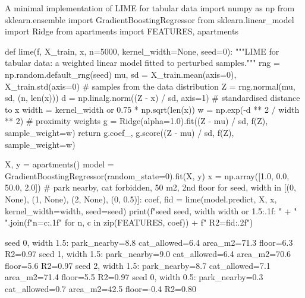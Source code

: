 \begin{pylisting}[label={lst:lime}]{A minimal implementation of LIME for tabular data}
import numpy as np
from sklearn.ensemble import GradientBoostingRegressor
from sklearn.linear_model import Ridge
from apartments import FEATURES, apartments

def lime(f, X_train, x, n=5000, kernel_width=None, seed=0):
    """LIME for tabular data: a weighted linear model fitted to perturbed samples."""
    rng = np.random.default_rng(seed)
    mu, sd = X_train.mean(axis=0), X_train.std(axis=0)
    # samples from the data distribution
    Z = rng.normal(mu, sd, (n, len(x)))
    d = np.linalg.norm((Z - x) / sd, axis=1)              # standardised distance to x
    width = kernel_width or 0.75 * np.sqrt(len(x))
    w = np.exp(-d ** 2 / width ** 2)                      # proximity weights
    g = Ridge(alpha=1.0).fit((Z - mu) / sd, f(Z), sample_weight=w)
    return g.coef_, g.score((Z - mu) / sd, f(Z), sample_weight=w)

X, y = apartments()
model = GradientBoostingRegressor(random_state=0).fit(X, y)
x = np.array([1.0, 0.0, 50.0, 2.0])         # park nearby, cat forbidden, 50 m2, 2nd floor
for seed, width in [(0, None), (1, None), (2, None), (0, 0.5)]:
    coef, fid = lime(model.predict, X, x, kernel_width=width, seed=seed)
    print(f"seed {seed}, width {width or 1.5:.1f}: "
          + " ".join(f"{n}={c:.1f}" for n, c in zip(FEATURES, coef)) + f"  R2={fid:.2f}")
\end{pylisting}
\begin{pyoutput}
seed 0, width 1.5: park_nearby=8.8 cat_allowed=6.4 area_m2=71.3 floor=6.3  R2=0.97
seed 1, width 1.5: park_nearby=9.0 cat_allowed=6.4 area_m2=70.6 floor=5.6  R2=0.97
seed 2, width 1.5: park_nearby=8.7 cat_allowed=7.1 area_m2=71.4 floor=5.5  R2=0.97
seed 0, width 0.5: park_nearby=0.3 cat_allowed=0.7 area_m2=42.5 floor=-0.4  R2=0.80
\end{pyoutput}

